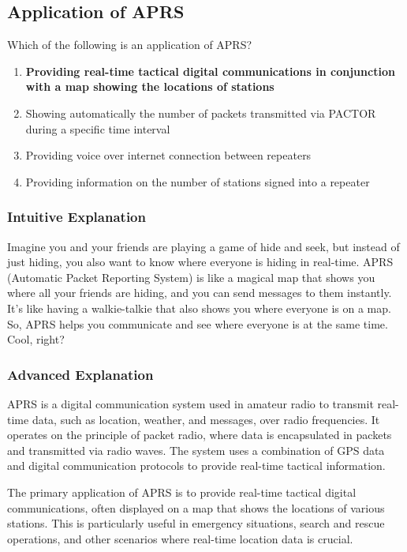 \subsection{Application of APRS}
\label{T8D05}

\begin{tcolorbox}[colback=gray!10!white,colframe=black!75!black,title=T8D05]
Which of the following is an application of APRS?
\begin{enumerate}[label=\Alph*)]
    \item \textbf{Providing real-time tactical digital communications in conjunction with a map showing the locations of stations}
    \item Showing automatically the number of packets transmitted via PACTOR during a specific time interval
    \item Providing voice over internet connection between repeaters
    \item Providing information on the number of stations signed into a repeater
\end{enumerate}
\end{tcolorbox}

\subsubsection{Intuitive Explanation}
Imagine you and your friends are playing a game of hide and seek, but instead of just hiding, you also want to know where everyone is hiding in real-time. APRS (Automatic Packet Reporting System) is like a magical map that shows you where all your friends are hiding, and you can send messages to them instantly. It’s like having a walkie-talkie that also shows you where everyone is on a map. So, APRS helps you communicate and see where everyone is at the same time. Cool, right?

\subsubsection{Advanced Explanation}
APRS is a digital communication system used in amateur radio to transmit real-time data, such as location, weather, and messages, over radio frequencies. It operates on the principle of packet radio, where data is encapsulated in packets and transmitted via radio waves. The system uses a combination of GPS data and digital communication protocols to provide real-time tactical information.

The primary application of APRS is to provide real-time tactical digital communications, often displayed on a map that shows the locations of various stations. This is particularly useful in emergency situations, search and rescue operations, and other scenarios where real-time location data is crucial.

